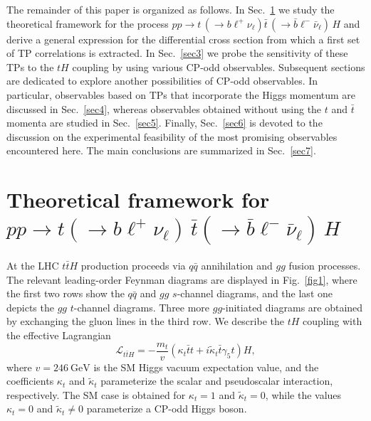 \documentclass[aps,preprint,tightenlines,floatfix,superscriptaddress,nofootinbib,showpacs]{revtex4-1}
\def\beq{\begin{equation}}
\def\eeq{\end{equation}}
\def\tbar{\bar{t}}
\def\bbar{\bar{b}}
\def\nubar{{\bar{\nu}}_{\ell}}
\def\ppprocess{pp\to t\,\left(\rightarrow b {\ell}^+ \nu_{\ell}\right) \tbar\,\left(\rightarrow\bbar {\ell}^-\nubar\right)\,H}
\def\kp{\kappa_t}
\def\kpt{\tilde{\kappa}_t}
\begin{document}
The remainder of this paper is organized as follows. In
Sec.~\ref{sec2} we study the theoretical framework for the process
$\ppprocess$ and derive a general expression for the differential
cross section from which a first set of TP correlations is
extracted. In Sec.~\ref{sec3} we probe the sensitivity of these TPs to
the $tH$ coupling by using various $\mathrm{CP}$-odd
observables. Subsequent sections are dedicated to explore another
possibilities of $\mathrm{CP}$-odd observables. In particular,
observables based on TPs that incorporate the Higgs momentum are
discussed in Sec.~\ref{sec4}, whereas observables obtained without
using the $t$ and $\tbar$ momenta are studied in
Sec.~\ref{sec5}. Finally, Sec.~\ref{sec6} is devoted to the discussion
on the experimental feasibility of the most promising observables
encountered here. The main conclusions are summarized in
Sec.~\ref{sec7}.

\setlength{\abovedisplayskip}{10.6pt}
\setlength{\belowdisplayskip}{10.6pt}
\section{Theoretical framework for \MakeLowercase{{\boldmath $pp\to t(\to b {\ell}^+ \nu_{\ell})\,\bar{t}(\to\bar{b} {\ell}^-\bar{\nu}_{\ell})$}}$\,H$}
\label{sec2}


At the LHC $t\bar{t}H$ production proceeds via $q\bar{q}$
annihilation and $gg$ fusion processes. The relevant leading-order Feynman
diagrams are displayed in Fig.~\ref{fig1}, where the first two
rows show the $q\bar{q}$ and $gg$ $s$-channel diagrams, and
the last one depicts the $gg$ $t$-channel diagrams.  Three more
$gg$-initiated diagrams are obtained by exchanging the gluon
lines in the third row.
We describe the $tH$ coupling with the effective Lagrangian
%
\beq
\label{eq1}
\mathcal{L}_{t\bar{t}H}=-\frac{m_t}{v}(\kp \tbar t+i\kpt \tbar
\gamma_5 t)H,
\eeq
%
where $v=246~\mathrm{GeV}$ is the SM Higgs vacuum
expectation value, and the coefficients $\kp$ and $\kpt$ parameterize 
the scalar and pseudoscalar interaction, respectively. The
SM case is obtained for $\kp=1$ and $\kpt=0$, while the values $\kp=0$
and $\kpt\neq 0$ parameterize a $\mathrm{CP}$-odd Higgs boson.
\end{document}
